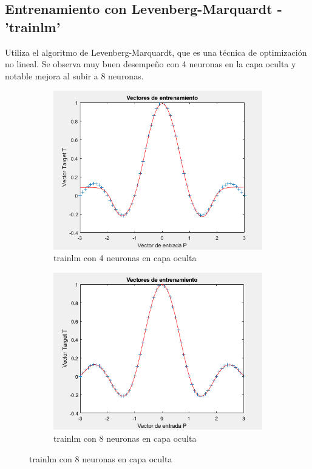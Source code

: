 \documentclass[a4paper, 12pt]{article}
\begin{document}
            
            \subsection{Entrenamiento con Levenberg-Marquardt - 'trainlm'}
                Utiliza el algoritmo de Levenberg-Marquardt, que es una técnica de optimización no lineal. Se observa muy buen desempeño con 4 neuronas en la capa oculta y notable mejora al subir a 8 neuronas.

                \begin{figure}[htp!]
                    \caption{Levenberg-Marquardt}
                    \begin{subfigure}{0.49\textwidth}
                        \centering
        		      \includegraphics[width=\textwidth]{figures/parte1/Ej2/Ej2_fig3_trainlm.png}
                        \caption{trainlm con 4 neuronas en capa oculta}
                    \end{subfigure}
                    \begin{subfigure}{0.49\textwidth}
                        \includegraphics[width=\textwidth]{figures/parte1/Ej2/Ej2_fig7_trainlm_8neuronas.png}
                        \caption{trainlm con 8 neuronas en capa oculta}
                    \end{subfigure}
                \end{figure}
\end{document}

